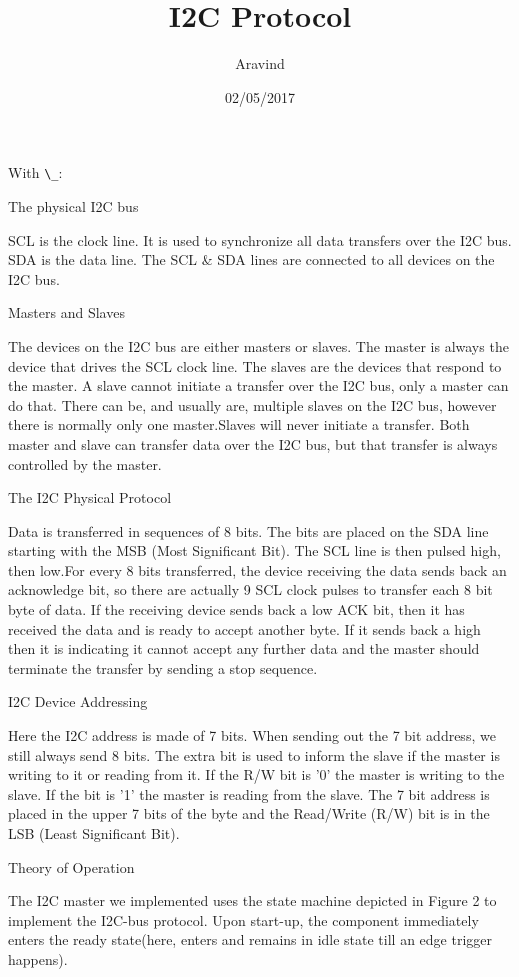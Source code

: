 \documentclass[10pt,twocolumn]{IEEEtran}
\author{Aravind}
\title{I2C Protocol}
\date{02/05/2017}
\begin{document}
  With \verb!\_!:
  \maketitle
   The physical I2C bus

SCL is the clock line. It is used to synchronize all data transfers over the I2C bus. SDA is the data line. The SCL & SDA lines are connected to all devices on the I2C bus.

Masters and Slaves

The devices on the I2C bus are either masters or slaves. The master is always the device that drives the SCL clock line. The slaves are the devices that respond to the master. A slave cannot initiate a transfer over the I2C bus, only a master can do that. There can be, and usually are, multiple slaves on the I2C bus, however there is normally only one master.Slaves will never initiate a transfer. Both master and slave can transfer data over the I2C bus, but that transfer is always controlled by the master.

The I2C Physical Protocol

Data is transferred in sequences of 8 bits. The bits are placed on the SDA line starting with the MSB (Most Significant Bit). The SCL line is then pulsed high, then low.For every 8 bits transferred, the device receiving the data sends back an acknowledge bit, so there are actually 9 SCL clock pulses to transfer each 8 bit byte of data. If the receiving device sends back a low ACK bit, then it has received the data and is ready to accept another byte. If it sends back a high then it is indicating it cannot accept any further data and the master should terminate the transfer by sending a stop sequence. 

I2C Device Addressing

Here the I2C address is made of 7 bits. When sending out the 7 bit address, we still always send 8 bits. The extra bit is used to inform the slave if the master is  writing to it or reading from it. If the R/W bit is '0' the master is writing to the slave. If the bit is '1' the master is reading from the slave. The 7 bit address is placed in the upper 7 bits of the byte and the Read/Write (R/W) bit is in the LSB (Least Significant Bit).

   Theory of Operation

The I2C master we implemented uses the state machine depicted in Figure 2 to implement the I2C-bus protocol. Upon start-up, the component immediately enters the ready state(here, enters and remains in idle state till an edge trigger happens). 
\end{document}

